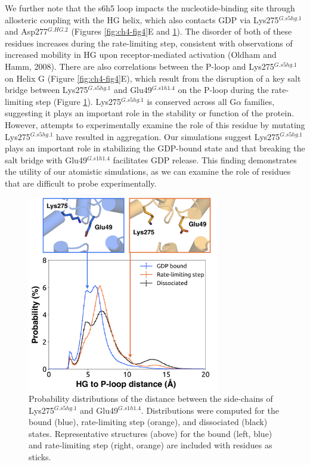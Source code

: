 \documentclass[../main.tex]{subfiles}
\begin{document}
        We further note that the s6h5 loop impacts the nucleotide-binding site through allosteric coupling with the HG helix, which also contacts GDP via Lys275$^{G.s5hg.1}$ and Asp277$^{G.HG.2}$ (Figures \ref{fig:ch4-fig4}E and \ref{fig:ch4-fig6}). The disorder of both of these residues increases during the rate-limiting step, consistent with observations of increased mobility in HG upon receptor-mediated activation (Oldham and Hamm, 2008). There are also correlations between the P-loop and Lys275$^{G.s5hg.1}$ on Helix G (Figure \ref{fig:ch4-fig4}E), which result from the disruption of a key salt bridge between Lys275$^{G.s5hg.1}$ and Glu49$^{G.s1h1.4}$ on the P-loop during the rate-limiting step (Figure \ref{fig:ch4-fig6}). Lys275$^{G.s5hg.1}$ is conserved across all G$\alpha$ families, suggesting it plays an important role in the stability or function of the protein. However, attempts to experimentally examine the role of this residue by mutating Lys275$^{G.s5hg.1}$ have resulted in aggregation\cite{Sun:2015gj}. Our simulations suggest Lys275$^{G.s5hg.1}$ plays an important role in stabilizing the GDP-bound state and that breaking the salt bridge with Glu49$^{G.s1h1.4}$ facilitates GDP release. This finding demonstrates the utility of our atomistic simulations, as we can examine the role of residues that are difficult to probe experimentally.

        \begin{figure}[H] %
            \centering
            \includegraphics[width=3.3in]{ch4-fig6.png}
            \caption[Probability distributions of the distance between the side-chains of Lys275$^{G.s5hg.1}$ and Glu49$^{G.s1h1.4}$.]
                {Probability distributions of the distance between the side-chains of Lys275$^{G.s5hg.1}$ and Glu49$^{G.s1h1.4}$. Distributions were computed for the bound (blue), rate-limiting step (orange), and dissociated (black) states. Representative structures (above) for the bound (left, blue) and rate-limiting step (right, orange) are included with residues as sticks.}
            \label{fig:ch4-fig6}
        \end{figure}
\end{document}
